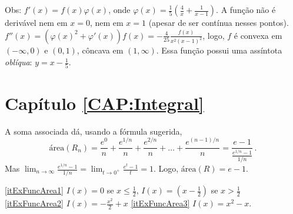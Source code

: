 \begin{Solution}{8.9}
\begin{center}
\begin{bmlimage}\end{bmlimage}
\end{center}
Obs: $f'(x)=f(x)\varphi(x)$, onde
$\varphi(x)=\tfrac15(\tfrac{4}{x}+\tfrac{1}{x-1})$.
A função não é derivável nem em $x=0$, nem em $x=1$
(apesar de ser contínua nesses pontos).
$f''(x)=(\varphi(x)^2+\varphi'(x))f(x)=-\tfrac{4}{25}
\frac{f(x)}{x^2(x-1)^2}$, logo, $f$ é convexa em
$(-\infty,0)$ e $(0,1)$, côncava em $(1,\infty)$.
Essa função possui uma assíntota \emph{oblíqua}:
$y=x-\tfrac15$.
\end{Solution}
\protect \section *{Capítulo \ref {CAP:Integral}}
\begin{Solution}{9.3}
A soma associada dá, usando a fórmula sugerida,
\[
\text{área}(R_n)=\frac{e^0}{n}+\frac{e^{1/n}}{n}
+\frac{e^{2/n}}{n}+\dots+\frac{e^{(n-1)/n}}{n}
=\frac{e-1}{\frac{e^{1/n}-1}{1/n}}\,.
\]
Mas $\lim_{n\to\infty}\frac{e^{1/n}-1}{1/n}=\lim_{t\to
0^+}\frac{e^t-1}{t}=1$. Logo,
$\text{área}(R)=e-1$.
\end{Solution}
\begin{Solution}{9.5}
\eqref{itExFuncArea1} $I(x)=0$ se $x\leq \frac12$, $I(x)=(x-\frac12)$ se
$x>\frac12$
\eqref{itExFuncArea2} $I(x)=-\frac{x^2}{2}+x$
\eqref{itExFuncArea3} $I(x)=x^2-x$.
\end{Solution}
